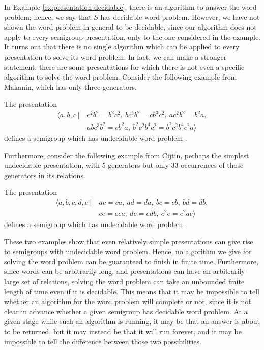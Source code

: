 In Example \ref{ex:presentation-decidable}, there is an algorithm to answer the
word problem; hence, we
say that $S$ has decidable word problem.  However, we have not shown the word
problem in general to be decidable, since our algorithm does not apply to every
semigroup presentation, only to the one considered in the example.  It turns out
that there is no single algorithm which can be applied to every presentation to
solve its word problem.  In fact, we can make a stronger statement: there are
some presentations for which there is not even a specific algorithm to solve
the word problem.  Consider the
following example from Makanin, which has only three generators.

\begin{example}[Makanin, 1966]
  \label{ex:makanin}
  The presentation
  \begin{align*}
    \langle a,b,c ~|~ & c^2b^2 = b^2c^2,\ bc^3b^2 = cb^3c^2,\ ac^2b^2 = b^2a,\\
                      & abc^3b^2 = cb^2a,\ b^2c^2b^4c^2 = b^2c^2b^4c^2a \rangle
  \end{align*}
  defines a semigroup which has undecidable word problem \cite{makanin_1966}.
\end{example}

Furthermore, consider the following example from Cijtin, perhaps the
simplest undecidable presentation, with 5 generators but only 33 occurrences of
those generators in its relations.

\begin{example}[Cijtin, 1957]
  \label{ex:cijtin}
  The presentation
  \begin{align*}
    \langle a,b,c,d,e ~|~ & ac=ca,\ ad=da,\ bc=cb,\ bd=db,\\
                          & ce=eca,\ de=edb,\ c^2e=c^2ae \rangle
  \end{align*}
  defines a semigroup which has undecidable word problem
  \cite{cijtin_1957, collins_1986}.
\end{example}

These two examples show that even relatively simple presentations can give rise
to semigroups with undecidable word problem.  Hence, no algorithm we give for
solving the word problem can be guaranteed to finish in finite time.
Furthermore, since words can be arbitrarily long, and presentations can have an
arbitrarily large set of relations, solving the word problem can take an
unbounded finite length of time even if it is decidable.  This means that it may
be impossible to tell whether an algorithm for the word problem will complete or
not, since it is not clear in advance whether a given semigroup has decidable
word problem.  At a given stage while such an algorithm is running, it may be
that an answer is about to be returned, but it may instead be that it will run
forever, and it may be impossible to tell the difference between those two
possibilities.

